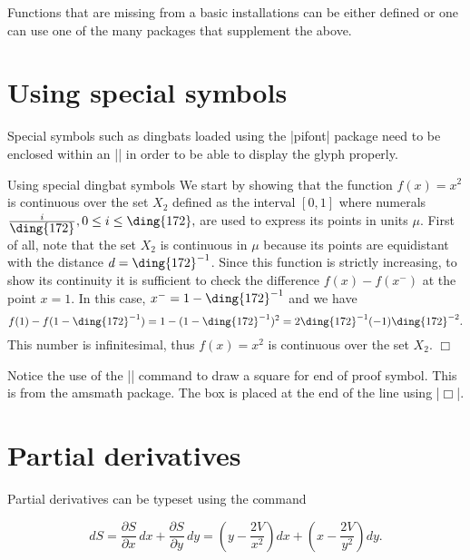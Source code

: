 Functions that are missing from a basic installations can be either defined or one can use one of the many packages that supplement the above.


\section{Using special symbols}

Special symbols such as dingbats loaded using the |pifont| package need to be enclosed within an |\mbox| in order to be able to display the glyph properly.
\bigskip

\begin{texexample}{Using special dingbat symbols}{}
\label{e14}
 We start by showing that the function $f(x)=x^2$ is
continuous over the set $X_2$\label{p:X2} defined as the interval
$[0,1]$ where numerals $\frac{i}{\mbox{\ding{172}}}, 0 \le i \le
\mbox{\ding{172}},$ are used to express its points in units $\mu$.
First of all, note that the set $X_2$ is continuous in   $\mu$
because its points are equidistant with the distance
$d=\mbox{\ding{172}}^{-1}$. Since this function is strictly
increasing,  to show its continuity it is sufficient to check the
difference $f(x)-f(x^{-})$ at the point $x=1$. In this case,
$x^{-}=1-\mbox{\ding{172}}^{-1}$ and we have
\[
 f(1)-f(1-\mbox{\ding{172}}^{-1})=
 1-(1-\mbox{\ding{172}}^{-1})^2 =
 2\mbox{\ding{172}}^{-1}(-1)\mbox{\ding{172}}^{-2}.
\]
This number is infinitesimal, thus $f(x)=x^2$ is continuous over
the set $X_2$. \hfill $\Box$
\end{texexample}

Notice the use of the |\Box| command to draw a square for  end of proof symbol. This is from the amsmath package. The box is placed at the end of the line using |\hfill $\Box$|.




\section{Partial derivatives}

Partial derivatives can be typeset using the \latex{} command \cmd{\partial}

\begin{texexample}{}{}

\[
dS = \frac{\partial S}{\partial x}\, dx
   + \frac{\partial S}{\partial y}\, dy
   = \left(y - \frac{2V}{x^2}\right) dx
   + \left(x - \frac{2V}{y^2}\right) dy.
\]
\end{texexample}




